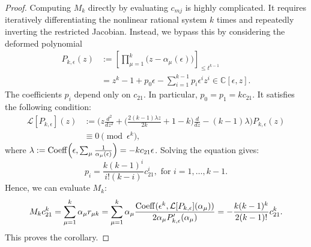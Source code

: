 \documentclass[11pt]{amsart}
\theoremstyle{remark}
\numberwithin{equation}{section}
\begin{document}
\begin{proof}
Computing $M_k$ directly by evaluating $c_{m j}$ is highly complicated. It requires iteratively differentiating the nonlinear rational system $k$ times and repeatedly inverting the restricted Jacobian. Instead, we bypass this by considering the deformed polynomial
\[
\begin{split}
    P_{k,\epsilon}(z) &:= \left[ \prod_{\mu=1}^k \Big(z - \alpha_\mu(\epsilon)\Big) \right]_{\leq t^{k-1}} 
    \\
    &= z^k-1 + p_0 \epsilon - \sum_{i=1}^{k-1} p_i \epsilon^i z^i \in \mathbb{C}[\epsilon, z].
\end{split}
\] 
The coefficients $p_i$ depend only on $c_{21}$. In particular, $p_0 = p_1 = kc_{21}$. It satisfies the following condition:
\[
\begin{split}
    \mathcal{L}[P_{k,\epsilon}](z) &:= \Bigg( z \frac{d^2}{dz^2} + \Big( \frac{ 2(k-1)\lambda z}{2k} + 1-k\Big) \frac{d}{dz} - (k-1)\lambda \Bigg) P_{k,\epsilon}(z) 
    \\
    &\equiv 0  \pmod{\epsilon^k},
\end{split}
\]
where $\lambda := {\rm Coeff}\Big(\epsilon,\sum_\mu \frac{1}{\alpha_{\mu}(\epsilon)}\Big) = -k c_{21} \epsilon$. 
Solving the equation gives:
\[
    p_i =  \frac{k(k-1)^i}{i! (k-i)} c_{21}^i, \text{ for }i=1,\dots,k-1.
\]
Hence, we can evaluate $M_k$:
\[
    M_k c_{21}^k = \sum_{\mu=1}^k \alpha_\mu r_{\mu k} = \sum_{\mu=1}^k \alpha_\mu \frac{ {\rm Coeff}(\epsilon^k,\mathcal{L}[P_{k,\epsilon}](\alpha_\mu) )}{ 2\alpha_\mu P_{k,\epsilon}'(\alpha_\mu) } = - \frac{k(k-1)^k}{2(k-1)!} c_{21}^k.
\]
This proves the corollary.
\end{proof}
\end{document}
